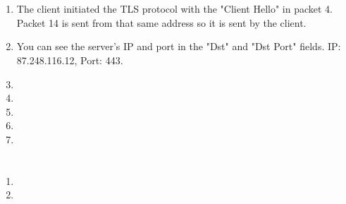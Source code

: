 \documentclass[12pt, a4paper]{article}
\begin{document}
\section{} %
\begin{enumerate}[a]
	\item %
	The client initiated the TLS protocol with the "Client Hello" in packet 4. Packet 14 is sent from that same address so it is sent by the client.
	\item %
	You can see the server's IP and port in the "Dst" and "Dst Port" fields. IP: 87.248.116.12, Port: 443.
	\item %
	\item %
	\item %
	\item %
	\item %
\end{enumerate}

\section{} %
\begin{enumerate}[a]
	\item %
	\item %
\end{enumerate}
\end{document}
